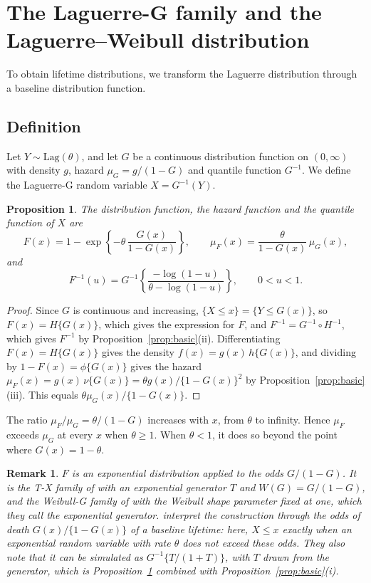 \documentclass[12pt]{article}
\newcommand{\Lag}{\mathrm{Lag}}  %
\newtheorem{proposition}{Proposition}
\newtheorem{remark}{Remark}
\begin{document}
\section{The Laguerre-G family and the Laguerre--Weibull distribution}\label{sec:family}

To obtain lifetime distributions, we transform the Laguerre distribution through a baseline distribution function.

\subsection{Definition}

Let $Y\sim\Lag(\theta)$, and let $G$ be a continuous distribution function on $(0,\infty)$ with density $g$, hazard $\mu_G=g/(1-G)$ and quantile function $G^{-1}$. We define the Laguerre-G random variable $X=G^{-1}(Y)$.

\begin{proposition}\label{prop:family}
The distribution function, the hazard function and the quantile function of $X$ are
\[
F(x)=1- \exp\left\{-\theta\,\frac{G(x)}{1-G(x)}\right\},
\qquad
\mu_F(x)=\frac{\theta}{1-G(x)}\,\mu_G(x),
\]
and
\[
F^{-1}(u)=G^{-1}\left\{\frac{-\log(1-u)}{\theta-\log(1-u)}\right\}, \qquad 0<u<1.
\]
\end{proposition}

\begin{proof}
Since $G$ is continuous and increasing, $\{X\leq x\}=\{Y\leq G(x)\}$, so $F(x)=H\{G(x)\}$, which gives the expression for $F$, and $F^{-1}=G^{-1}\circ H^{-1}$, which gives $F^{-1}$ by Proposition~\ref{prop:basic}(ii). Differentiating $F(x)=H\{G(x)\}$ gives the density $f(x)=g(x)\,h\{G(x)\}$, and dividing by $1-F(x)=\phi\{G(x)\}$ gives the hazard $\mu_F(x)=g(x)\,\nu\{G(x)\}=\theta g(x)/\{1-G(x)\}^2$ by Proposition~\ref{prop:basic}(iii). This equals $\theta\mu_G(x)/\{1-G(x)\}$.
\end{proof}

The ratio $\mu_F/\mu_G=\theta/(1-G)$ increases with $x$, from $\theta$ to infinity. Hence $\mu_F$ exceeds $\mu_G$ at every $x$ when $\theta\geq 1$. When $\theta<1$, it does so beyond the point where $G(x)=1-\theta$.

\begin{remark}
$F$ is an exponential distribution applied to the odds $G/(1-G)$. It is the T-X family of \citet{alzaatreh2013new} with an exponential generator $T$ and $W(G)=G/(1-G)$, and the Weibull-G family of \citet{bourguignon2014weibull} with the Weibull shape parameter fixed at one, which they call the exponential generator. \citet{bourguignon2014weibull} interpret the construction through the odds of death $G(x)/\{1-G(x)\}$ of a baseline lifetime: here, $X\leq x$ exactly when an exponential random variable with rate $\theta$ does not exceed these odds. They also note that it can be simulated as $G^{-1}\{T/(1+T)\}$, with $T$ drawn from the generator, which is Proposition~\ref{prop:family} combined with Proposition~\ref{prop:basic}(i).
\end{remark}
\end{document}
